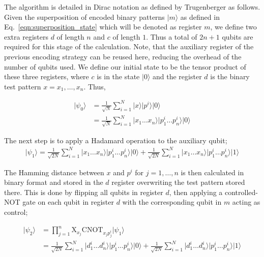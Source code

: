 The algorithm is detailed in Dirac notation as defined by Trugenberger \cite{Trugenberger_2001} as follows. Given the superposition of encoded binary patterns $\vert m \rangle$ as defined in Eq.~\eqref{eqn:superposition_state} which will be denoted as register $m$, we define two extra registers $d$ of length $n$ and $c$ of length $1$. Thus a total of $2n + 1$ qubits are required for this stage of the calculation. Note, that the auxiliary register of the previous encoding strategy can be reused here, reducing the overhead of the number of qubits used. We define our initial state to be the tensor product of these three registers, where $c$ is in the state $\vert 0 \rangle$ and the register $d$ is the binary test pattern $x = x_1,\dots,x_n$. Thus,

\begin{align*}
    \vert \psi_0 \rangle &= \frac{1}{\sqrt{N}}\sum\limits_{i=1}^{N} \vert x \rangle \vert p^i \rangle \vert 0 \rangle \\
    &= \frac{1}{\sqrt{N}}\sum\limits_{i=1}^{N} \vert x_1\dots x_n\rangle\vert p_{1}^{i}\dots p_{n}^{i}\rangle \vert 0 \rangle
\end{align*}

The next step is to apply a Hadamard operation to the auxiliary qubit;
\begin{align*}
    \vert \psi_1 \rangle = \frac{1}{\sqrt{2N}}\sum\limits_{i=1}^{N} \vert x_1\dots x_n\rangle\vert p_{1}^{i}\dots p_{n}^{i}\rangle \vert 0 \rangle + \frac{1}{\sqrt{2N}}\sum\limits_{i=1}^{N} \vert x_1\dots x_n\rangle\vert p_{1}^{i}\dots p_{n}^{i}\rangle \vert 1 \rangle
\end{align*}

The Hamming distance between $x$ and $p^i$ for $j=1,\dots, n$ is then calculated in binary format and stored in the $d$ register overwriting the test pattern stored there. This is done by flipping all qubits in register $d$, then applying a controlled-NOT gate on each qubit in register $d$ with the corresponding qubit in $m$ acting as control;

\begin{align*}
    \vert \psi_2 \rangle &= \prod\limits_{j=1}^{n}\textrm{X}_{x_j} \textrm{CNOT}_{x_{j}p_{j}^{i}} \vert \psi_1 \rangle\\
    &= \frac{1}{\sqrt{2N}}\sum\limits_{i=1}^{N} \vert d_1^i\dots d_n^i\rangle\vert p_{1}^{i}\dots p_{n}^{i}\rangle \vert 0 \rangle + \frac{1}{\sqrt{2N}}\sum\limits_{i=1}^{N} \vert d_1^i\dots d_n^i\rangle\vert p_{1}^{i}\dots p_{n}^{i}\rangle \vert 1 \rangle
\end{align*}

